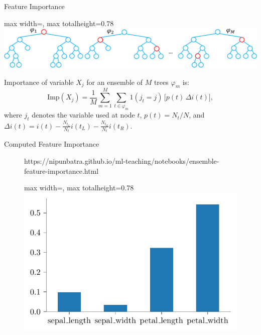 \documentclass[aspectratio=169,10pt]{beamer}
\newcommand{\fitpic}[1]{\begin{adjustbox}{max width=\linewidth, max totalheight=0.78\textheight}#1\end{adjustbox}}
\begin{document}
\begin{frame}{Feature Importance\footnotemark}
  \centering
  \fitpic{\includegraphics[scale=0.4]{../assets/ensemble/diagrams/mdi.pdf}}
  Importance of variable $X_j$ for an ensemble of $M$ trees $\varphi_{m}$ is:
  \begin{equation*}
    \text{Imp}(X_j) = \frac{1}{M} \sum_{m=1}^M \sum_{t \in \varphi_{m}} 1(j_t = j)\,\Big[ p(t)\,\Delta i(t) \Big],
  \end{equation*}
  where $j_t$ denotes the variable used at node $t$, $p(t)=N_t/N$, and\\
  $\Delta i(t) = i(t) - \frac{N_{t_L}}{N_t} i(t_L) - \frac{N_{t_R}}{N_t} i(t_R)$.
\end{frame}

\begin{frame}{Computed Feature Importance}
  \begin{figure}[htp]\centering
    \begin{notebookbox}{https://nipunbatra.github.io/ml-teaching/notebooks/ensemble-feature-importance.html}
      \fitpic{\includegraphics[scale=0.8]{../assets/ensemble/figures/feature-imp-forest.pdf}}
    \end{notebookbox}
  \end{figure}
\end{frame}
\end{document}
